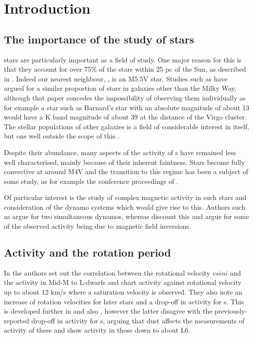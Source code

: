 \chapter{Introduction}
\protect\label{chapter:introduction}

\section{The importance of the study of {\rdwarf} stars}
\protect\label{section:introrwarfs}

{\rdwarf} stars are particularly important as a field of study. One major reason for this is that they account for over
75\% of the stars within 25 pc of the Sun, as described in \citet{winters15}. Indeed our nearest neighbour, \prox, is an
M5.5V star. Studies such as \citet{vandokkum2010} have argued for a similar proportion of {\rdwarf} stars in galaxies
other than the Milky Way, although that paper concedes the impossibility of observing them individually as for example a
star such as Barnard's star with an absolute magnitude of about 13 would have a K band magnitude of about 39 at the
distance of the Virgo cluster. The stellar populations of other galaxies is a field of considerable interest in itself,
but one well outside the scope of this \paperorthesis.

Despite their abundance, many aspects of the activity of \rdwarf s have remained less well characterised, mainly because
of their inherent faintness. Stars become fully convective at around M4V and the transition to this regime has been a
subject of some study, as for example the conference proceedings of \citet{stassun11}.

Of particular interest is the study of complex magnetic activity in such stars and consideration of the dynamo systems
which would give rise to this. Authors such as \citet{morin11} argue for two simultaneous dynamos, whereas
\citet{kitchatinov14} discount this and argue for some of the observed activity being due to magnetic field inversions.

\section{Activity and the rotation period}
\protect\label{section:introrotation}

In \citet{mohanty03} the authors set out the correlation between the rotational velocity $ v sin i $ and the activity in
Mid-M to L-dwarfs and chart activity against rotational velocity up to about 12 km/s where a saturation velocity is
observed. They also note an increase of rotation velocities for later stars and a drop-off in activity for
\ldwarf s. This is developed further in \citet{reiners08} and also \citet{schmidt14}, however the latter disagree with
the previously-reported drop-off in activity for \ldwarf s, arguing that dust affects the measurements of activity of
these and show activity in those down to about L6.

